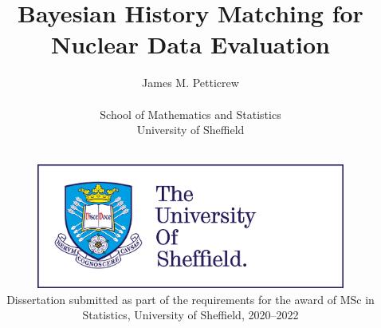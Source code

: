 


\title{Bayesian History Matching for Nuclear Data Evaluation}
\author{James M. Petticrew
\\$~$\vspace{0.5in}\\
School of Mathematics and Statistics\\
University of Sheffield}

\date{$~$\vspace{1.5in}\\
\includegraphics[width=4in]{figures/logo.jpg}\\
\vfill Dissertation submitted as part of the requirements for the award of MSc in Statistics, University of Sheffield, 2020--2022\\
}

\maketitle
